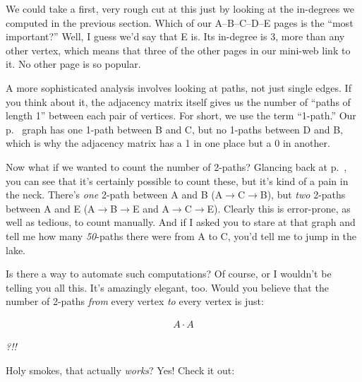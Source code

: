 We could take a first, very rough cut at this just by looking at the in-degrees
we computed in the previous section. Which of our A--B--C--D--E pages is the
``most important?'' Well, I guess we'd say that E is. Its in-degree is 3, more
than any other vertex, which means that three of the other pages in our
mini-web link to it. No other page is so popular.


A more sophisticated analysis involves looking at paths, not just single edges.
If you think about it, the adjacency matrix itself gives us the number of
``paths of length 1'' between each pair of vertices. For short, we use the term
``1-path.'' Our p.~\pageref{fig:directedGraph} graph has one 1-path between B
and C, but no 1-paths between D and B, which is why the adjacency matrix has a
1 in one place but a 0 in another.

Now what if we wanted to count the number of 2-paths? Glancing back at
p.~\pageref{fig:directedGraph}, you can see that it's certainly possible to
count these, but it's kind of a pain in the neck. There's \textit{one} 2-path
between A and B (A$\rightarrow$C$\rightarrow$B), but \textit{two} 2-paths
between A and E (A$\rightarrow$B$\rightarrow$E and
A$\rightarrow$C$\rightarrow$E). Clearly this is error-prone, as well as
tedious, to count manually. And if I asked you to stare at that graph and tell
me how many \textit{50}-paths there were from A to C, you'd tell me to jump in
the lake.

Is there a way to automate such computations? Of course, or I wouldn't be
telling you all this. It's amazingly elegant, too. Would you believe that the
number of 2-paths \textit{from} every vertex \textit{to} every vertex is just:

\vspace{-.15in}
\begin{align*}
A \cdot A
\end{align*}
\vspace{-.25in}

\textit{?!!}

\smallskip
Holy smokes, that actually \textit{works}? Yes! Check it out:

